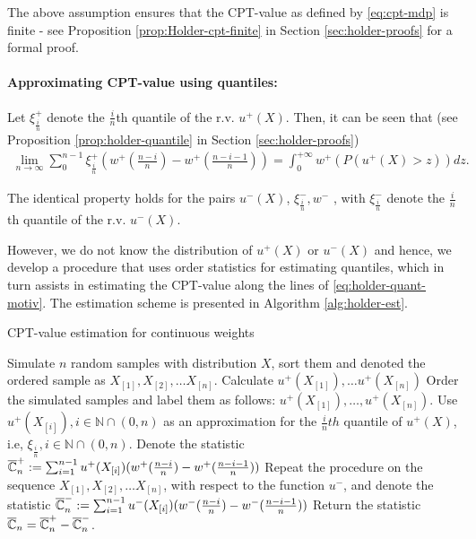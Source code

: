 \documentclass[11pt,letterpaper,english]{article}
\begin{document}
The above assumption ensures that the CPT-value as defined by \eqref{eq:cpt-mdp} is finite - see Proposition \ref{prop:Holder-cpt-finite} in Section \ref{sec:holder-proofs} for a formal proof.


\paragraph{Approximating CPT-value using quantiles:}
Let $\xi^+_{\frac{i}{n}}$ denote the $\frac{i}{n}$th quantile of the r.v. $u^+(X)$. Then, it can be seen that (see Proposition \ref{prop:holder-quantile} in Section \ref{sec:holder-proofs})
\begin{align}
\label{eq:holder-quant-motiv}
\lim_{n \rightarrow \infty} \sum_0^{n-1} \xi^+_{\frac{i}{n}} \left(w^+\left(\frac{n-i}{n}\right)- w^+\left(\frac{n-i-1}{n}\right) \right) = \int_0^{+\infty} w^+(P(u^+(X)>z)) dz.
\end{align}

The identical property holds for the pairs $u^-(X)$, $\xi^-_{\frac{i}{n}}, w^-$ , with $\xi^-_{\frac{i}{n}}$ denote the 
$\frac{i}{n}$th quantile of the r.v. $u^-(X)$.

However, we do not know the distribution of $u^+(X)$ or $u^-(X)$ and hence, we develop a procedure that uses order statistics for estimating quantiles, which in turn assists in estimating the CPT-value along the lines of \eqref{eq:holder-quant-motiv}. The estimation scheme is presented in Algorithm \ref{alg:holder-est}.

\begin{algorithm}
\caption{CPT-value estimation for \holder continuous weights}
\label{alg:holder-est}
\begin{algorithmic}[1]
\State Simulate $n$ random samples with distribution $X$, sort them and denoted the ordered sample as 
$X_{[1]}, X_{[2]}, \ldots X_{[n]}$.
\State Calculate $u^+(X_{[1]}),\ldots u^+(X_{[n]})$
\State Order the simulated samples and label them as follows: 
$u^+(X_{[1]}),\ldots,u^+(X_{[n]})$.
\State Use $u^+(X_{[i]}), i\in \mathbb{N}\cap (0,n)$ as an approximation for the $\frac{i}{n} th$ quantile of $u^+(X)$, i.e, $\xi_{\frac{i}{n}}, i\in \mathbb{N}\cap (0,n)$.
\State Denote the statistic 
$\overline {\mathbb{C}}_n^+:=\sum_{i=1}^{n-1} u^+(X_{[i]}) (w^+(\frac{n-i}{n})- w^+(\frac{n-i-1}{n}) )$
\State Repeat the procedure on the sequence $X_{[1]}, X_{[2]}, \ldots X_{[n]}$, with respect to the function $u^-$, 
and denote the statistic $\overline {\mathbb{C}}_n^-:=\sum_{i=1}^{n-1} u^-(X_{[i]}) (w^-(\frac{n-i}{n})- w^-(\frac{n-i-1}{n}) ) $
\State Return the statistic $\overline {\mathbb{C}}_n =\overline {\mathbb{C}}_n^+ - \overline {\mathbb{C}}_n^-$.
\end{algorithmic}
\end{algorithm}
\end{document}
